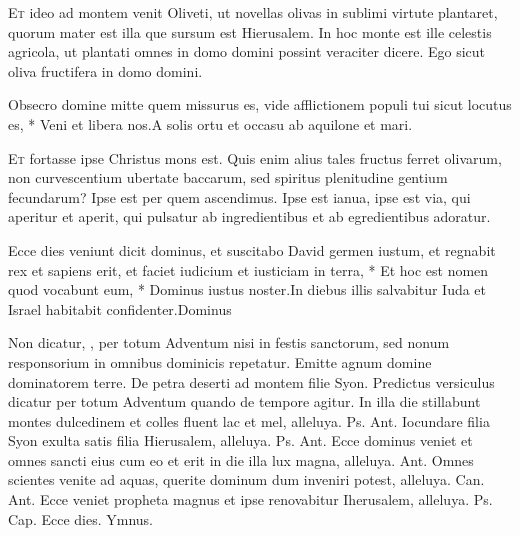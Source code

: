 \begin{multicols*}{2}
\begin{responsory}
\end{responsory}
\lettrine[lines=2]{\zallmancaps \color{Blue} E}{t} ideo ad montem venit Oliveti, ut novellas olivas in sublimi virtute plantaret, quorum mater est illa que sursum est Hierusalem. In hoc monte est ille celestis agricola, ut plantati omnes in domo domini possint veraciter dicere. Ego sicut oliva fructifera in domo domini.
\begin{responsory}
{Obsecro domine mitte quem missurus es, vide afflictionem populi tui sicut locutus es, * Veni et libera nos.}{A solis ortu et occasu ab aquilone et mari.}
\end{responsory}
\lettrine[lines=2]{\zallmancaps \color{Red} E}{t} fortasse ipse Christus mons est. Quis enim alius tales fructus ferret olivarum, non curvescentium ubertate baccarum, sed spiritus plenitudine gentium fecundarum? Ipse est per quem ascendimus. Ipse est ianua, ipse est via, qui aperitur et aperit, qui pulsatur ab ingredientibus et ab egredientibus adoratur.
\begin{responsory-final}
{Ecce dies veniunt dicit dominus, et suscitabo David germen iustum, et regnabit rex et sapiens erit, et faciet iudicium et iusticiam in terra, * Et hoc est nomen quod vocabunt eum, * Dominus iustus noster.}{In diebus illis salvabitur Iuda et Israel habitabit confidenter.}{Dominus}
\end{responsory-final}
Non dicatur, , per totum Adventum nisi in festis sanctorum, sed nonum responsorium in omnibus dominicis repetatur. \V Emitte agnum domine dominatorem terre. \R De petra deserti ad montem filie Syon. Predictus versiculus dicatur per totum Adventum quando de tempore agitur.
 In illa die stillabunt montes dulcedinem et colles fluent lac et mel, alleluya. {\color{Red} Ps.}  {\color{Red} Ant.} Iocundare filia Syon exulta satis filia Hierusalem, alleluya. {\color{Red} Ps.}  {\color{Red} Ant.} Ecce dominus veniet et omnes sancti eius cum eo et erit in die illa lux magna, alleluya.  {\color{Red} Ant.} Omnes scientes venite ad aquas, querite dominum dum inveniri potest, alleluya. {\color{Red} Can.}  {\color{Red} Ant.} Ecce veniet propheta magnus et ipse renovabitur Iherusalem, alleluya. {\color{Red} Ps.}  {\color{Red} Cap.} Ecce dies. {\color{Red} Ymnus.}

\end{multicols*}
